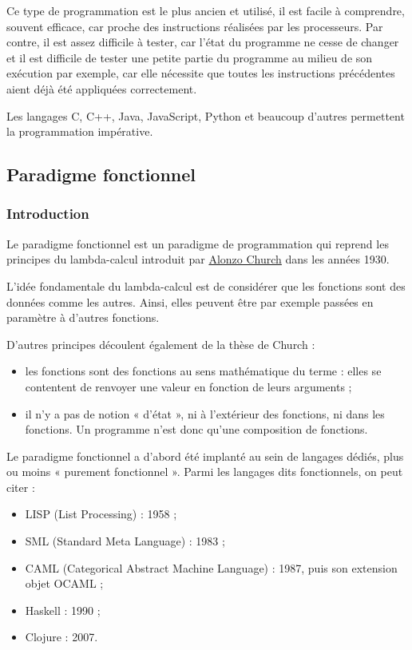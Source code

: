 \documentclass[
  a4paper,
  DIV=11,
  numbers=noendperiod]{scrartcl}
\providecommand{\tightlist}{%
  \setlength{\itemsep}{0pt}\setlength{\parskip}{0pt}}\usepackage{longtable,booktabs,array}
\begin{document}
Ce type de programmation est le plus ancien et utilisé, il est facile à
comprendre, souvent efficace, car proche des instructions réalisées par
les processeurs. Par contre, il est assez difficile à tester, car l'état
du programme ne cesse de changer et il est difficile de tester une
petite partie du programme au milieu de son exécution par exemple, car
elle nécessite que toutes les instructions précédentes aient déjà été
appliquées correctement.

Les langages C, C++, Java, JavaScript, Python et beaucoup d'autres
permettent la programmation impérative.

\hypertarget{paradigme-fonctionnel}{%
\subsection{Paradigme fonctionnel}\label{paradigme-fonctionnel}}

\hypertarget{introduction}{%
\subsubsection{Introduction}\label{introduction}}

Le paradigme fonctionnel est un paradigme de programmation qui reprend
les principes du lambda-calcul introduit par
\href{https://fr.wikipedia.org/wiki/Alonzo_Church}{Alonzo Church} dans
les années 1930.

L'idée fondamentale du lambda-calcul est de considérer que les fonctions
sont des données comme les autres. Ainsi, elles peuvent être par exemple
passées en paramètre à d'autres fonctions.

D'autres principes découlent également de la thèse de Church :

\begin{itemize}
\tightlist
\item
  les fonctions sont des fonctions au sens mathématique du terme : elles
  se contentent de renvoyer une valeur en fonction de leurs arguments ;
\item
  il n'y a pas de notion « d'état », ni à l'extérieur des fonctions, ni
  dans les fonctions. Un programme n'est donc qu'une composition de
  fonctions.
\end{itemize}

Le paradigme fonctionnel a d'abord été implanté au sein de langages
dédiés, plus ou moins « purement fonctionnel ». Parmi les langages dits
fonctionnels, on peut citer :

\begin{itemize}
\tightlist
\item
  LISP (List Processing) : 1958 ;
\item
  SML (Standard Meta Language) : 1983 ;
\item
  CAML (Categorical Abstract Machine Language) : 1987, puis son
  extension objet OCAML ;
\item
  Haskell : 1990 ;
\item
  Clojure : 2007.
\end{itemize}
\end{document}

